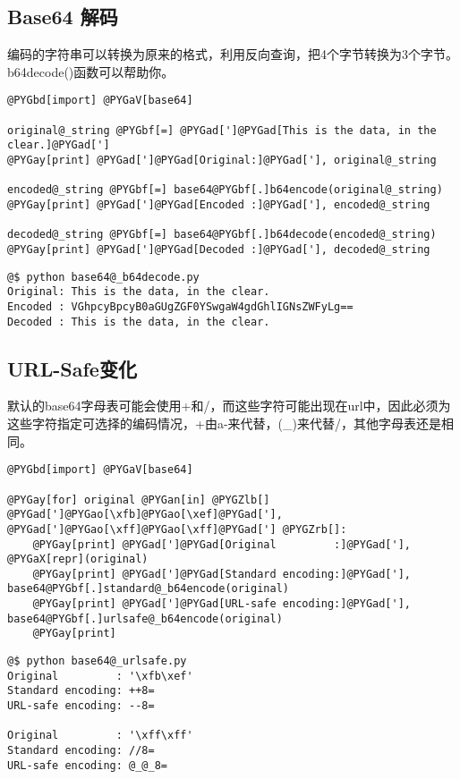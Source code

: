 \documentclass[letterpaper,10pt,english]{manual}
\begin{document}
\subsection{Base64 解码}

编码的字符串可以转换为原来的格式，利用反向查询，把4个字节转换为3个字节。b64decode()函数可以帮助你。

\begin{Verbatim}[commandchars=@\[\]]
@PYGbd[import] @PYGaV[base64]

original@_string @PYGbf[=] @PYGad[']@PYGad[This is the data, in the clear.]@PYGad[']
@PYGay[print] @PYGad[']@PYGad[Original:]@PYGad['], original@_string

encoded@_string @PYGbf[=] base64@PYGbf[.]b64encode(original@_string)
@PYGay[print] @PYGad[']@PYGad[Encoded :]@PYGad['], encoded@_string

decoded@_string @PYGbf[=] base64@PYGbf[.]b64decode(encoded@_string)
@PYGay[print] @PYGad[']@PYGad[Decoded :]@PYGad['], decoded@_string
\end{Verbatim}

\begin{Verbatim}[commandchars=@\[\]]
@$ python base64@_b64decode.py
Original: This is the data, in the clear.
Encoded : VGhpcyBpcyB0aGUgZGF0YSwgaW4gdGhlIGNsZWFyLg==
Decoded : This is the data, in the clear.
\end{Verbatim}


\subsection{URL-Safe变化}

默认的base64字母表可能会使用+和/，而这些字符可能出现在url中，因此必须为这些字符指定可选择的编码情况，+由a-来代替，(\_)来代替/，其他字母表还是相同。

\begin{Verbatim}[commandchars=@\[\]]
@PYGbd[import] @PYGaV[base64]

@PYGay[for] original @PYGan[in] @PYGZlb[] @PYGad[']@PYGao[\xfb]@PYGao[\xef]@PYGad['], @PYGad[']@PYGao[\xff]@PYGao[\xff]@PYGad['] @PYGZrb[]:
    @PYGay[print] @PYGad[']@PYGad[Original         :]@PYGad['], @PYGaX[repr](original)
    @PYGay[print] @PYGad[']@PYGad[Standard encoding:]@PYGad['], base64@PYGbf[.]standard@_b64encode(original)
    @PYGay[print] @PYGad[']@PYGad[URL-safe encoding:]@PYGad['], base64@PYGbf[.]urlsafe@_b64encode(original)
    @PYGay[print]
\end{Verbatim}

\begin{Verbatim}[commandchars=@\[\]]
@$ python base64@_urlsafe.py
Original         : '\xfb\xef'
Standard encoding: ++8=
URL-safe encoding: --8=

Original         : '\xff\xff'
Standard encoding: //8=
URL-safe encoding: @_@_8=
\end{Verbatim}
\end{document}
